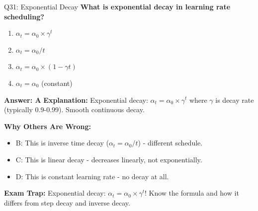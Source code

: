 \documentclass[8pt]{beamer}
\begin{document}
	\begin{frame}{Q31: Exponential Decay}
		\fontsize{6.5}{7.5}\selectfont
		\textbf{What is exponential decay in learning rate scheduling?}
		
		\begin{enumerate}
			\item $\alpha_t = \alpha_0 \times \gamma^{t}$
			\item $\alpha_t = \alpha_0 / t$
			\item $\alpha_t = \alpha_0 \times (1 - \gamma t)$
			\item $\alpha_t = \alpha_0$ (constant)
		\end{enumerate}
		
		\vspace{0.05cm}
		\textcolor{myblue}{\textbf{Answer: A}}
		\vspace{0.05cm}
		\textcolor{myblue}{\textbf{Explanation:}} Exponential decay: $\alpha_t = \alpha_0 \times \gamma^{t}$ where $\gamma$ is decay rate (typically 0.9-0.99). Smooth continuous decay.
		
		\vspace{0.05cm}
		\textcolor{myred}{\textbf{Why Others Are Wrong:}}
		\begin{itemize}
			\item \textcolor{myred}{B:} This is inverse time decay ($\alpha_t = \alpha_0 / t$) - different schedule.
			\item \textcolor{myred}{C:} This is linear decay - decreases linearly, not exponentially.
			\item \textcolor{myred}{D:} This is constant learning rate - no decay at all.
		\end{itemize}
		
		\textcolor{myred}{\textbf{Exam Trap:}} Exponential decay: $\alpha_t = \alpha_0 \times \gamma^{t}$! Know the formula and how it differs from step decay and inverse decay.
	\end{frame}
	
\end{document}
